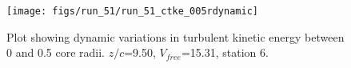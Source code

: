 \begin{figure}[H]
\centering
\texttt{[image: figs/run\_51/run\_51\_ctke\_005rdynamic]}
\caption{Plot showing dynamic variations in turbulent kinetic energy between 0 and 0.5 core radii. $z/c$=9.50, $V_{free}$=15.31, station 6.}
\label{fig:run_51_ctke_005rdynamic}
\end{figure}


